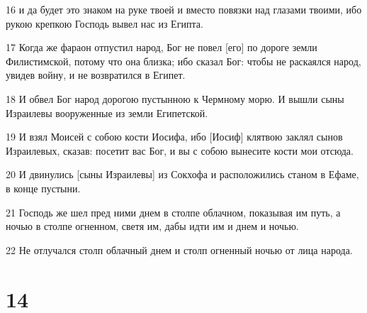 \par 16 и да будет это знаком на руке твоей и вместо повязки над глазами твоими, ибо рукою крепкою Господь вывел нас из Египта.
\par 17 Когда же фараон отпустил народ, Бог не повел [его] по дороге земли Филистимской, потому что она близка; ибо сказал Бог: чтобы не раскаялся народ, увидев войну, и не возвратился в Египет.
\par 18 И обвел Бог народ дорогою пустынною к Чермному морю. И вышли сыны Израилевы вооруженные из земли Египетской.
\par 19 И взял Моисей с собою кости Иосифа, ибо [Иосиф] клятвою заклял сынов Израилевых, сказав: посетит вас Бог, и вы с собою вынесите кости мои отсюда.
\par 20 И двинулись [сыны Израилевы] из Сокхофа и расположились станом в Ефаме, в конце пустыни.
\par 21 Господь же шел пред ними днем в столпе облачном, показывая им путь, а ночью в столпе огненном, светя им, дабы идти им и днем и ночью.
\par 22 Не отлучался столп облачный днем и столп огненный ночью от лица народа.

\chapter{14}

